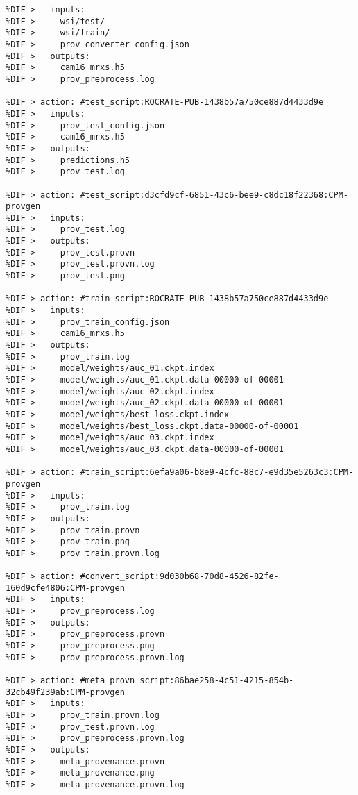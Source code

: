 \documentclass[10pt,letterpaper]{article}
\providecommand{\DIFaddbegin}{} %
\providecommand{\DIFmodbegin}{} %
\providecommand{\DIFmodend}{} %
\newcommand{\DIFaddincludegraphics}[2][]{{\color{blue}\fbox{\DIFOincludegraphics[#1]{#2}}}} %
\DeclareRobustCommand{\DIFaddbegin}{\DIFOaddbegin \let\includegraphics\DIFaddincludegraphics} %
\begin{document}
\DIFaddbegin \DIFmodbegin
\begin{lstlisting}[float,basicstyle=\scriptsize\ttfamily,caption={Excerpt of the output of the \texttt{runcrate report} command for the AI model training Process Run Crate; only inputs and outputs of the actions are shown. The listing shows the connections between the pipeline actions through the entities they produce or consume -- e.g., \texttt{cam16\_mrxs.h5} is output of the conversion script \texttt{convert\_script:ff67\ldots} and input for the training script \texttt{train\_script:ROCRATE\ldots}},label={lst:model_training_pipeline_report},alsolanguage=DIFcode]
%DIF > action: #convert_script:ff67ce65-736f-46d5-9fec-10953cad8695
%DIF >   inputs:
%DIF >     wsi/test/
%DIF >     wsi/train/
%DIF >     prov_converter_config.json
%DIF >   outputs:
%DIF >     cam16_mrxs.h5
%DIF >     prov_preprocess.log

%DIF > action: #test_script:ROCRATE-PUB-1438b57a750ce887d4433d9e
%DIF >   inputs:
%DIF >     prov_test_config.json
%DIF >     cam16_mrxs.h5
%DIF >   outputs:
%DIF >     predictions.h5
%DIF >     prov_test.log

%DIF > action: #test_script:d3cfd9cf-6851-43c6-bee9-c8dc18f22368:CPM-provgen
%DIF >   inputs:
%DIF >     prov_test.log
%DIF >   outputs:
%DIF >     prov_test.provn
%DIF >     prov_test.provn.log
%DIF >     prov_test.png

%DIF > action: #train_script:ROCRATE-PUB-1438b57a750ce887d4433d9e
%DIF >   inputs:
%DIF >     prov_train_config.json
%DIF >     cam16_mrxs.h5
%DIF >   outputs:
%DIF >     prov_train.log
%DIF >     model/weights/auc_01.ckpt.index
%DIF >     model/weights/auc_01.ckpt.data-00000-of-00001
%DIF >     model/weights/auc_02.ckpt.index
%DIF >     model/weights/auc_02.ckpt.data-00000-of-00001
%DIF >     model/weights/best_loss.ckpt.index
%DIF >     model/weights/best_loss.ckpt.data-00000-of-00001
%DIF >     model/weights/auc_03.ckpt.index
%DIF >     model/weights/auc_03.ckpt.data-00000-of-00001

%DIF > action: #train_script:6efa9a06-b8e9-4cfc-88c7-e9d35e5263c3:CPM-provgen
%DIF >   inputs:
%DIF >     prov_train.log
%DIF >   outputs:
%DIF >     prov_train.provn
%DIF >     prov_train.png
%DIF >     prov_train.provn.log

%DIF > action: #convert_script:9d030b68-70d8-4526-82fe-160d9cfe4806:CPM-provgen
%DIF >   inputs:
%DIF >     prov_preprocess.log
%DIF >   outputs:
%DIF >     prov_preprocess.provn
%DIF >     prov_preprocess.png
%DIF >     prov_preprocess.provn.log

%DIF > action: #meta_provn_script:86bae258-4c51-4215-854b-32cb49f239ab:CPM-provgen
%DIF >   inputs:
%DIF >     prov_train.provn.log
%DIF >     prov_test.provn.log
%DIF >     prov_preprocess.provn.log
%DIF >   outputs:
%DIF >     meta_provenance.provn
%DIF >     meta_provenance.png
%DIF >     meta_provenance.provn.log
\end{lstlisting}
\DIFmodend
\end{document}
